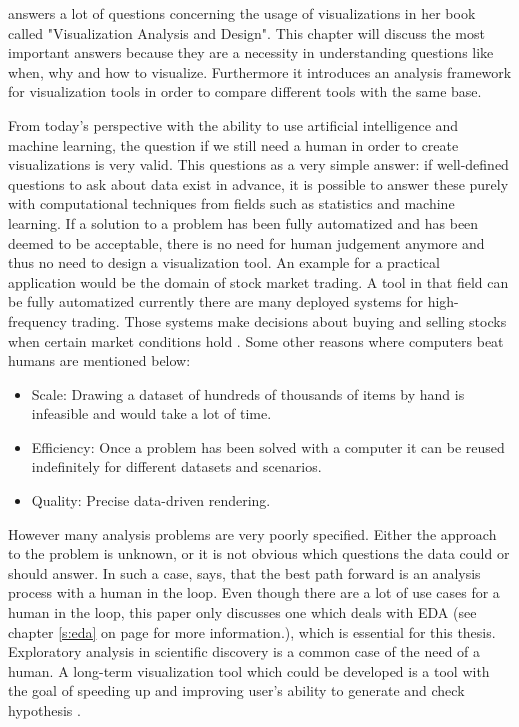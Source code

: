 \citeauthor{Munzner2014} answers a lot of questions concerning the usage of visualizations in her book called "Visualization Analysis and Design". This chapter will discuss the most important answers because they are a necessity in understanding questions like when, why and how to visualize. Furthermore it introduces an analysis framework for visualization tools in order to compare different tools with the same base.

From today's perspective with the ability to use artificial intelligence and machine learning, the question if we still need a human in order to create visualizations is very valid. This questions as a very simple answer: if well-defined questions to ask about data exist in advance, it is possible to answer these purely with computational techniques from fields such as statistics and machine learning. If a solution to a problem has been fully automatized and has been deemed to be acceptable, there is no need for human judgement anymore and thus no need to design a visualization tool. An example for a practical application would be the domain of stock market trading. A tool in that field can be fully automatized currently there are many deployed systems for high-frequency trading. Those systems make decisions about buying and selling stocks when certain market conditions hold . Some other reasons where computers beat humans are mentioned below:
\begin{itemize}
\item Scale: Drawing a dataset of hundreds of thousands of items by hand is infeasible and would take a lot of time.
\item Efficiency: Once a problem has been solved with a computer it can be reused  indefinitely for different datasets and scenarios.
\item Quality: Precise data-driven rendering.
\end{itemize}
However many analysis problems are very poorly specified. Either the approach to the problem is unknown, or it is not obvious which questions the data could or should answer. In such a case, \citeauthor{Munzner2014} says, that the best path forward is an analysis process with a human in the loop. Even though there are a lot of use cases for a human in the loop, this paper only discusses one which deals with \ac{EDA} (see chapter \ref{s:eda} on page \pageref{s:eda} for more information.), which is essential for this thesis. Exploratory analysis in scientific discovery is a common case of the need of a human. A long-term visualization tool which could be developed is a tool with the goal of speeding up and improving user's ability to generate and check hypothesis .

